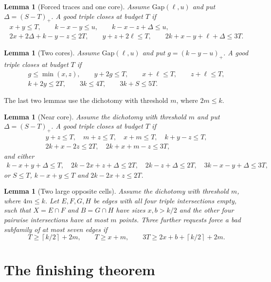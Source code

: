 \documentclass[11pt]{article}
\numberwithin{equation}{section}
\newtheorem{lemma}[theorem]{Lemma}
\theoremstyle{definition}
\theoremstyle{remark}
\newcommand{\ceil}[1]{\left\lceil #1\right\rceil}
\newcommand{\Gap}{\mathrm{Gap}}
\begin{document}
\begin{lemma}[Forced traces and one core]\label{lem:gapcore}
Assume $\Gap(\ell,u)$ and put $\Delta=(S-T)_+$. A good triple closes at
budget $T$ if
\begin{gather*}
 x+y\le T,\qquad k-x-y\le u,\qquad k-x-z+\Delta\le u,\\
 2x+2\Delta+k-y-z\le2T,\qquad y+z+2\ell\le T,\qquad 2k+x-y+\ell+\Delta\le3T.
\end{gather*}
\end{lemma}

\begin{lemma}[Two cores]\label{lem:twocores}
Assume $\Gap(\ell,u)$ and put $g=(k-y-u)_+$. A good triple closes at
budget $T$ if
\begin{gather*}
 g\le\min(x,z),\qquad y+2g\le T,\qquad x+\ell\le T,\qquad z+\ell\le T,\\
 k+2y\le2T,\qquad 3k\le4T,\qquad 3k+S\le5T.
\end{gather*}
\end{lemma}

The last two lemmas use the dichotomy with threshold $m$, where
$2m\le k$.

\begin{lemma}[Near core]\label{lem:nearcore}
Assume the dichotomy with threshold $m$ and put $\Delta=(S-T)_+$. A good
triple closes at budget $T$ if
\begin{gather*}
 y+z\le T,\quad m+z\le T,\quad x+m\le T,\quad k+y-z\le T,\\
 2k+x-2z\le2T,\quad 2k+x+m-z\le3T,
\end{gather*}
and either
\begin{gather*}
 k-x+y+\Delta\le T,\quad 2k-2x+z+\Delta\le2T,\quad
 2k-z+\Delta\le2T,\quad 3k-x-y+\Delta\le3T,
\end{gather*}
or $S\le T$, $k-x+y\le T$ and $2k-2x+z\le2T$.
\end{lemma}

\begin{lemma}[Two large opposite cells]\label{lem:twolarge}
Assume the dichotomy with threshold $m$, where $4m\le k$. Let $E,F,G,H$
be edges with all four triple intersections empty, such that
$X=E\cap F$ and $B=G\cap H$ have sizes $x,b>k/2$ and the other four
pairwise intersections have at most $m$ points. Three further requests
force a bad subfamily of at most seven edges if
\[
 T\ge\ceil{k/2}+2m,\qquad T\ge x+m,\qquad 3T\ge2x+b+\ceil{k/2}+2m.
\]
\end{lemma}

\section{The finishing theorem}\label{sec:finish}
\end{document}
